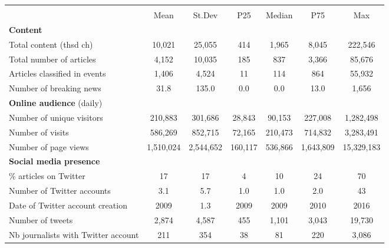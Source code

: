 {
\def\sym#1{\ifmmode^{#1}\else\(^{#1}\)\fi}
\begin{tabular}{l*{1}{cccccc}}
\hline\hline
                    &\multicolumn{6}{c}{}                                                         \\
                    &        Mean&      St.Dev&         P25&      Median&         P75&         Max\\
\hline
\textbf{Content}    &            &            &            &            &            &            \\
Total content (thsd ch)&      10,021&      25,055&         414&       1,965&       8,045&     222,546\\
Total number of articles&       4,152&      10,035&         185&         837&       3,366&      85,676\\
Articles classified in events&       1,406&       4,524&          11&         114&         864&      55,932\\
Number of breaking news&        31.8&       135.0&         0.0&         0.0&        13.0&       1,656\\
\textbf{Online audience} (daily)&            &            &            &            &            &            \\
Number of unique visitors&     210,883&     301,686&      28,843&      90,153&     227,008&   1,282,498\\
Number of visits    &     586,269&     852,715&      72,165&     210,473&     714,832&   3,283,491\\
Number of page views&   1,510,024&   2,544,652&     160,117&     536,866&   1,643,809&  15,329,183\\
\textbf{Social media presence}&            &            &            &            &            &            \\
\% articles on Twitter&          17&          17&           4&          10&          24&          70\\
Number of Twitter accounts&         3.1&         5.7&         1.0&         1.0&         2.0&          43\\
Date of Twitter account creation&        2009&         1.3&        2009&        2009&        2010&        2016\\
Number of tweets    &       2,874&       4,587&         455&       1,101&       3,043&      19,730\\
Nb journalists with Twitter account&         211&         354&          38&          81&         220&       3,086\\

\end{tabular}}
